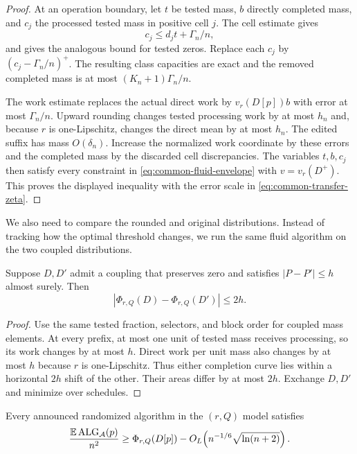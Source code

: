 \begin{proof}
At an operation boundary, let $t$ be tested mass, $b$ directly completed
mass, and $c_j$ the processed tested mass in positive cell $j$.  The cell
estimate gives
\[
 c_j\le d_jt+\Gamma_n/n,
\]
and gives the analogous bound for tested zeros.  Replace each $c_j$ by
$(c_j-\Gamma_n/n)^+$.  The resulting class capacities are exact and the
removed completed mass is at most $(K_n+1)\Gamma_n/n$.

The work estimate replaces the actual direct work by
$v_r(D[p])b$ with error at most $\Gamma_n/n$.  Upward rounding changes tested
processing work by at most $h_n$ and, because $r$ is one-Lipschitz, changes
the direct mean by at most $h_n$.  The edited suffix has mass
$O(\delta_n)$.  Increase the normalized work coordinate by these errors and
the completed mass by the discarded cell discrepancies.  The variables
$t,b,c_j$ then satisfy every constraint in
\cref{eq:common-fluid-envelope} with $v=v_r(D^+)$.  This proves the
displayed inequality with the error scale in
\cref{eq:common-transfer-zeta}.
\end{proof}

We also need to compare the rounded and original distributions.  Instead of
tracking how the optimal threshold changes, we run the same fluid algorithm
on the two coupled distributions.

\begin{lemma}
\label{lem:common-transfer-rounding-stability}
Suppose $D,D'$ admit a coupling that preserves zero and satisfies
$|P-P'|\le h$ almost surely.  Then
\begin{equation}
 |\Phi_{r,Q}(D)-\Phi_{r,Q}(D')|\le2h.
 \label{eq:common-transfer-rounding-stability}
\end{equation}
\end{lemma}

\begin{proof}
Use the same tested fraction, selectors, and block order for coupled mass
elements.  At every prefix, at most one unit of tested mass receives
processing, so its work changes by at most $h$.  Direct work per unit mass
also changes by at most $h$ because $r$ is one-Lipschitz.  Thus either
completion curve lies within a horizontal $2h$ shift of the other.  Their
areas differ by at most $2h$.  Exchange $D,D'$ and minimize over schedules.
\end{proof}

\begin{claim}
\label{clm:common-announced-lower}
Every announced randomized algorithm in the $(r,Q)$ model satisfies
\begin{equation}
 \frac{\mathbb{E}\operatorname{ALG}_{\mathcal A}(p)}{n^2}
 \ge\Phi_{r,Q}(D[p])
 -O_L\!\left(n^{-1/6}\sqrt{\ln(n+2)}\right).
 \label{eq:common-announced-lower}
\end{equation}
\end{claim}

